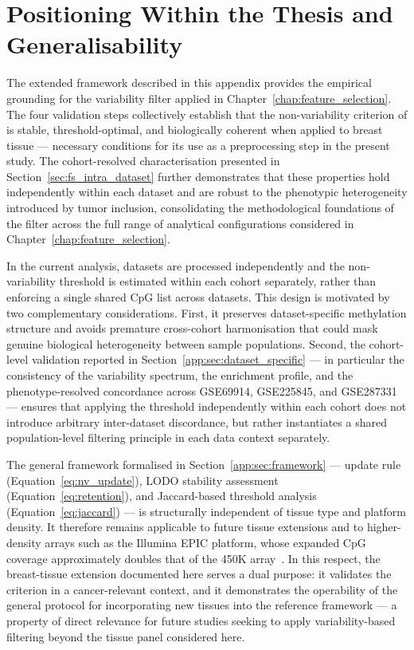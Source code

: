 \section{Positioning Within the Thesis and Generalisability}
\label{app:sec:positioning}

The extended framework described in this appendix provides the 
empirical grounding for the variability filter applied in 
Chapter~\ref{chap:feature_selection}. The four validation steps 
collectively establish that the non-variability criterion of 
\cite{Edgar2017} is stable, threshold-optimal, and biologically 
coherent when applied to breast tissue — necessary conditions for 
its use as a preprocessing step in the present study. The 
cohort-resolved characterisation presented in 
Section~\ref{sec:fs_intra_dataset} further demonstrates that 
these properties hold independently within each dataset and are 
robust to the phenotypic heterogeneity introduced by tumor 
inclusion, consolidating the methodological foundations of the 
filter across the full range of analytical configurations 
considered in Chapter~\ref{chap:feature_selection}.

In the current analysis, datasets are processed independently 
and the non-variability threshold is estimated within each 
cohort separately, rather than enforcing a single shared CpG 
list across datasets. This design is motivated by two 
complementary considerations. First, it preserves 
dataset-specific methylation structure and avoids premature 
cross-cohort harmonisation that could mask genuine biological 
heterogeneity between sample populations. Second, the 
cohort-level validation reported in 
Section~\ref{app:sec:dataset_specific} — in particular the 
consistency of the variability spectrum, the enrichment 
profile, and the phenotype-resolved concordance across 
GSE69914, GSE225845, and GSE287331 — ensures that applying 
the threshold independently within each cohort does not 
introduce arbitrary inter-dataset discordance, but rather 
instantiates a shared population-level filtering principle 
in each data context separately.

The general framework formalised in 
Section~\ref{app:sec:framework} — update rule 
(Equation~\ref{eq:nv_update}), LODO stability 
assessment (Equation~\ref{eq:retention}), and 
Jaccard-based threshold analysis 
(Equation~\ref{eq:jaccard}) — is structurally 
independent of tissue type and platform density. 
It therefore remains applicable to future tissue 
extensions and to higher-density arrays such as 
the Illumina EPIC platform, whose expanded CpG 
coverage approximately doubles that of the 450K 
array~\cite{Pidsley2016}. In this respect, the 
breast-tissue extension documented here serves 
a dual purpose: it validates the criterion in a 
cancer-relevant context, and it demonstrates the 
operability of the general protocol for 
incorporating new tissues into the reference 
framework — a property of direct relevance for 
future studies seeking to apply variability-based 
filtering beyond the tissue panel considered here.

